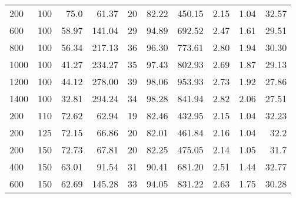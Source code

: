 \begin{table}[H]
{{\begin{tabular}{lrrrrrrrrr}
                \hline
                200        & 100                  & 75.0              & 61.37           & 20       & 82.22          & 450.15                     & 2.15      & 1.04              & 32.57                    \\
                600        & 100                  & 58.97             & 141.04          & 29       & 94.89          & 692.52                     & 2.47      & 1.61              & 29.51                    \\
                800        & 100                  & 56.34             & 217.13          & 36       & 96.30          & 773.61                     & 2.80      & 1.94              & 30.30                    \\
                1000       & 100                  & 41.27             & 234.27          & 35       & 97.43          & 802.93                     & 2.69      & 1.87              & 29.13                    \\
                1200       & 100                  & 44.12             & 278.00          & 39       & 98.06          & 953.93                     & 2.73      & 1.92              & 27.86                    \\
                1400       & 100                  & 32.81             & 294.24          & 34       & 98.28          & 841.94                     & 2.82      & 2.06              & 27.51                    \\
                \hline
                200        & 110                  & 72.62             & 62.94           & 19       & 82.46          & 432.95                     & 2.15      & 1.04              & 32.23                    \\
                200        & 125                  & 72.15             & 66.86           & 20       & 82.01          & 461.84                     & 2.16      & 1.04              & 32.2                     \\
                \hline
                200        & 150                  & 72.73             & 67.81           & 20       & 82.25          & 475.05                     & 2.14      & 1.05              & 31.7                     \\
                400        & 150                  & 63.01             & 91.54           & 31       & 90.41          & 681.20                     & 2.51      & 1.44              & 32.77                    \\
                600        & 150                  & 62.69             & 145.28          & 33       & 94.05          & 831.22                     & 2.63      & 1.75              & 30.28                    \\

\end{tabular}}}
\end{table}
